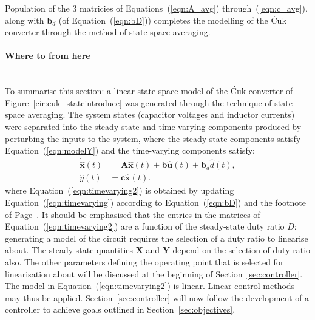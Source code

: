 Population of the 3 matricies of Equations~(\ref{eqn:A_avg}) through~(\ref{eqn:c_avg}), along with $\boldsymbol{b}_d$ (of Equation~(\ref{eqn:bD})) completes the modelling of the \'{C}uk converter through the method of state-space averaging.
\paragraph{Where to from here}
~\\
To summarise this section: a linear state-space model of the \'Cuk converter of Figure~\ref{cir:cuk_stateintroduce} was generated through the technique of state-space averaging. The system states (capacitor voltages and inductor currents) were separated into the steady-state and time-varying components produced by perturbing the inputs to the system, where the steady-state components satisfy Equation~(\ref{eqn:modelY}) and the time-varying components satisfy:
\begin{align}
\dot{\hat{\boldsymbol{x}}}(t)
&= \boldsymbol{A} \hat{\boldsymbol{x}}(t) + \boldsymbol{b} \hat{\boldsymbol{u}}(t)
+ \boldsymbol{b}_d \hat{d}(t),\nonumber
\\[11pt]
\hat{y}(t) &= \boldsymbol{c} \hat{\boldsymbol{x}}(t).\label{eqn:timevarying2}
\end{align}
where Equation~(\ref{eqn:timevarying2}) is obtained by updating Equation~(\ref{eqn:timevarying}) according to Equation~(\ref{eqn:bD}) and the footnote of Page~\pageref{eqn:timevarying}.
\newpar
It should be emphasised that the entries in the matrices of Equation~(\ref{eqn:timevarying2}) are a function of the steady-state duty ratio $D$: generating a model of the circuit requires the selection of a duty ratio to linearise about. The steady-state quantities $\boldsymbol{X}$ and $\boldsymbol{Y}$ depend on the selection of duty ratio also. The other parameters defining the operating point that is selected for linearisation about will be discussed at the beginning of Section~\ref{sec:controller}.
\newpar
The model in Equation~(\ref{eqn:timevarying2}) is linear. Linear control methods may thus be applied. Section~\ref{sec:controller} will now follow the development of a controller to achieve goals outlined in Section~\ref{sec:objectives}.